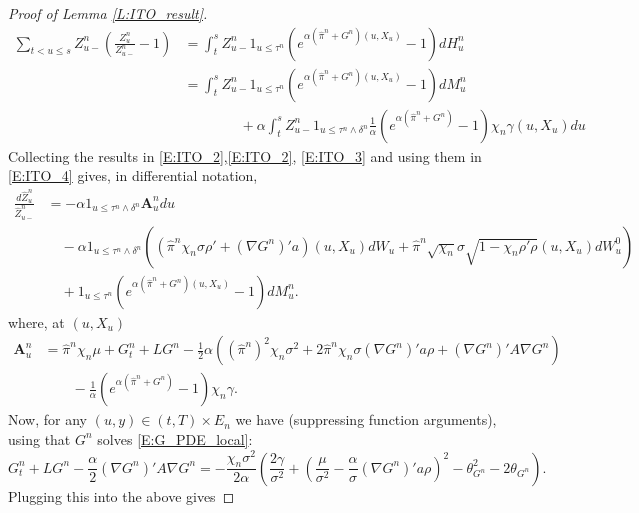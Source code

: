 \documentclass[11pt, letterpaper]{amsart}
\theoremstyle{definition}
\theoremstyle{remark}
\numberwithin{equation}{section}
\newcommand{\hz}{\hat{Z}}
\newcommand{\hpi}{\hat{\pi}}
\begin{document}
\begin{proof}[Proof of Lemma \ref{L:ITO_result}]
\begin{equation}\label{E:ITO_4}
\begin{split}
\sum_{t<u\leq s} Z^n_{u-}\left(\frac{Z^n_u}{Z^n_{u-}}-1\right) &= \int_t^s Z^n_{u-}1_{u\leq\tau^n}\left(e^{\alpha\left(\hpi^n + G^n\right)(u,X_u)}-1\right)dH^n_u\\
&= \int_t^s Z^n_{u-}1_{u\leq\tau^n}\left(e^{\alpha\left(\hpi^n + G^n\right)(u,X_u)}-1\right)dM^n_u\\
&\qquad\qquad  + \alpha\int_t^sZ^n_{u-}1_{u\leq\tau^n\wedge\delta^n}\frac{1}{\alpha}\left(e^{\alpha\left(\hpi^n + G^n\right)}-1\right)\chi_n\gamma(u,X_u)du
\end{split}
\end{equation}
Collecting the results in \eqref{E:ITO_2},\eqref{E:ITO_2}, \eqref{E:ITO_3} and using them in \eqref{E:ITO_4} gives, in differential notation,
\begin{equation}\label{E:ITO_5}
\begin{split}
\frac{d\hz^n_u}{\hz^n_{u-}} & = -\alpha 1_{u\leq \tau^n\wedge\delta^n}\mathbf{A}^n_u du\\
&\quad -\alpha 1_{u\leq\tau^n\wedge\delta^n}\left(\left(\hpi^n\chi_n\sigma \rho' + (\nabla G^n)'a\right)(u,X_u)dW_u + \hpi^n\sqrt{\chi_n}\sigma\sqrt{1-\chi_n\rho'\rho}(u,X_u)dW^0_u\right)\\
&\quad + 1_{u\leq \tau^n}\left(e^{\alpha\left(\hpi^n + G^n\right)(u,X_u)}-1\right)dM^n_u.
\end{split}
\end{equation}
where, at $(u,X_u)$
\begin{equation*}
\begin{split}
\mathbf{A}^n_u &= \hpi^n\chi_n\mu + G^n_t + LG^n - \frac{1}{2}\alpha\left((\hpi^n)^2\chi_n\sigma^2 + 2\hpi^n\chi_n\sigma(\nabla G^n)'a\rho + (\nabla G^n)'A\nabla G^n\right)\\
&\qquad -\frac{1}{\alpha}\left(e^{\alpha\left(\hpi^n+G^n\right)}-1\right)\chi_n\gamma.
\end{split}
\end{equation*}
Now, for any $(u,y)\in (t,T)\times E_n$ we have (suppressing function arguments), using that $G^n$ solves \eqref{E:G_PDE_local}:
\begin{equation*}
G^n_t + LG^n - \frac{\alpha}{2}(\nabla G^n)'A\nabla G^n = -\frac{\chi_n\sigma^2}{2\alpha}\left(\frac{2\gamma}{\sigma^2} + \left(\frac{\mu}{\sigma^2} - \frac{\alpha}{\sigma}(\nabla G^n)'a\rho\right)^2 - \theta_{G^n}^2 - 2\theta_{G^n}\right).
\end{equation*}
Plugging this into the above gives

\end{proof}
\end{document}
